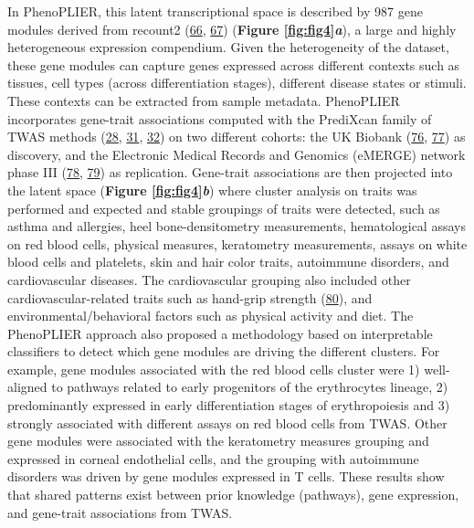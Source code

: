 In PhenoPLIER, this latent transcriptional space is described by 987 gene modules derived from recount2 (\protect\hyperlink{ref-14rnBunuZ}{66}, \protect\hyperlink{ref-6SPTvFXq}{67}) (\textbf{Figure \ref{fig:fig4}\emph{a}}), a large and highly heterogeneous expression compendium.
Given the heterogeneity of the dataset, these gene modules can capture genes expressed across different contexts such as tissues, cell types (across differentiation stages), different disease states or stimuli.
These contexts can be extracted from sample metadata.
PhenoPLIER incorporates gene-trait associations computed with the PrediXcan family of TWAS methods (\protect\hyperlink{ref-Z8bvDdVq}{28}, \protect\hyperlink{ref-vLyTudUB}{31}, \protect\hyperlink{ref-1FFzCXo1s}{32}) on two different cohorts: the UK Biobank (\protect\hyperlink{ref-nmJxPpE5}{76}, \protect\hyperlink{ref-lY5ln3dB}{77}) as discovery, and the Electronic Medical Records and Genomics (eMERGE) network phase III (\protect\hyperlink{ref-wfqjCerX}{78}, \protect\hyperlink{ref-gZAOkumx}{79}) as replication.
Gene-trait associations are then projected into the latent space (\textbf{Figure \ref{fig:fig4}\emph{b}}) where cluster analysis on traits was performed and expected and stable groupings of traits were detected, such as asthma and allergies, heel bone-densitometry measurements, hematological assays on red blood cells, physical measures, keratometry measurements, assays on white blood cells and platelets, skin and hair color traits, autoimmune disorders, and cardiovascular diseases.
The cardiovascular grouping also included other cardiovascular-related traits such as hand-grip strength (\protect\hyperlink{ref-WIZh9VF9}{80}), and environmental/behavioral factors such as physical activity and diet.
The PhenoPLIER approach also proposed a methodology based on interpretable classifiers to detect which gene modules are driving the different clusters.
For example, gene modules associated with the red blood cells cluster were 1) well-aligned to pathways related to early progenitors of the erythrocytes lineage, 2) predominantly expressed in early differentiation stages of erythropoiesis and 3) strongly associated with different assays on red blood cells from TWAS.
Other gene modules were associated with the keratometry measures grouping and expressed in corneal endothelial cells, and the grouping with autoimmune disorders was driven by gene modules expressed in T cells.
These results show that shared patterns exist between prior knowledge (pathways), gene expression, and gene-trait associations from TWAS.

